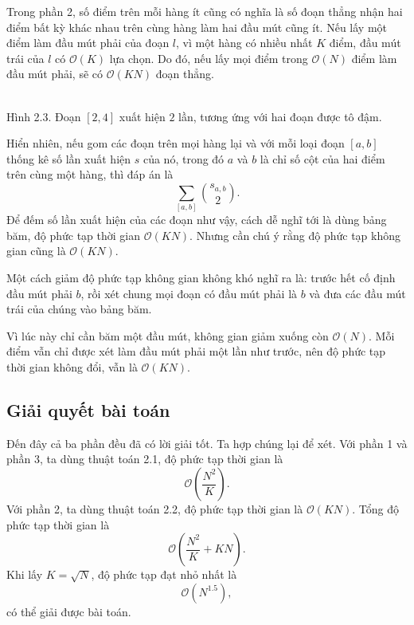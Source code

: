 \documentclass[11pt]{article}
\newcommand{\Oh}{\mathcal{O}}
\begin{document}
Trong phần 2, số điểm trên mỗi hàng ít cũng có nghĩa là số đoạn thẳng nhận
hai điểm bất kỳ khác nhau trên cùng hàng làm hai đầu mút cũng ít. Nếu lấy một
điểm làm đầu mút phải của đoạn $l$, vì một hàng có nhiều nhất $K$ điểm, đầu
mút trái của $l$ có $\Oh(K)$ lựa chọn. Do đó, nếu lấy mọi điểm trong
$\Oh(N)$ điểm làm đầu mút phải, sẽ có $\Oh(KN)$ đoạn thẳng.

\begin{center}
\\[-0.2em]
{\small Hình 2.3. Đoạn \([2,4]\) xuất hiện \(2\) lần, tương ứng với hai đoạn
được tô đậm.}
\end{center}

Hiển nhiên, nếu gom các đoạn trên mọi hàng lại và với mỗi loại đoạn $[a,b]$
thống kê số lần xuất hiện $s$ của nó, trong đó $a$ và $b$ là chỉ số cột của
hai điểm trên cùng một hàng, thì đáp án là
\[
  \sum_{[a,b]} \binom{s_{a,b}}{2}.
\]
Để đếm số lần xuất hiện của các đoạn như vậy, cách dễ nghĩ tới là dùng bảng
băm, độ phức tạp thời gian $\Oh(KN)$. Nhưng cần chú ý rằng độ phức tạp không
gian cũng là $\Oh(KN)$.

Một cách giảm độ phức tạp không gian không khó nghĩ ra là: trước hết cố định
đầu mút phải $b$, rồi xét chung mọi đoạn có đầu mút phải là $b$ và đưa các
đầu mút trái của chúng vào bảng băm.

Vì lúc này chỉ cần băm một đầu mút, không gian giảm xuống còn $\Oh(N)$. Mỗi
điểm vẫn chỉ được xét làm đầu mút phải một lần như trước, nên độ phức tạp
thời gian không đổi, vẫn là $\Oh(KN)$.

\subsection{Giải quyết bài toán}

Đến đây cả ba phần đều đã có lời giải tốt. Ta hợp chúng lại để xét. Với phần
1 và phần 3, ta dùng thuật toán 2.1, độ phức tạp thời gian là
\[
  \Oh\left(\frac{N^2}{K}\right).
\]
Với phần 2, ta dùng thuật toán 2.2, độ phức tạp thời gian là $\Oh(KN)$. Tổng
độ phức tạp thời gian là
\[
  \Oh\left(\frac{N^2}{K}+KN\right).
\]
Khi lấy $K=\sqrt{N}$, độ phức tạp đạt nhỏ nhất là
\[
  \Oh(N^{1.5}),
\]
có thể giải được bài toán.
\end{document}

